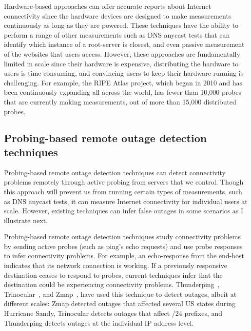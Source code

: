 Hardware-based approaches can offer accurate reports about
Internet connectivity since the hardware devices are designed to make
measurements continuously as long as they are powered. These techniques have the
ability to perform a range of other measurements such as DNS anycast
tests that can identify which instance of a root-server is closest,
and even passive measurement of the websites that users
access. However, these approaches are fundamentally limited in scale
since their hardware is expensive, distributing the hardware to users
is time consuming, and convincing users to keep their hardware running
is challenging. For example, the RIPE Atlas project, which began in
2010 and has been continuously expanding all across the world, has fewer than 10,000 probes that are currently making measurements, out
of more than 15,000 distributed probes.
 
\subsection{Probing-based remote outage detection techniques}


Probing-based remote outage detection techniques can detect
connectivity problems remotely through active probing from servers
that we control. Though this approach will prevent us from running
certain types of measurements, such as DNS anycast tests, it can measure
Internet connectivity for individual users at scale. However,
existing techniques can infer false outages in some scenarios as I
illustrate next.

Probing-based remote outage detection techniques study connectivity problems by
sending active probes (such as ping's echo requests) and use probe
responses to infer connectivity problems. For example, an
echo-response from the end-host indicates that its network connection
is working. If a previously responsive destination ceases to respond
to probes, current techniques infer that the destination could be
experiencing connectivity problems. Thunderping~\cite{pingin},
Trinocular~\cite{trinocular}, and Zmap~\cite{durumeric2013zmap}, have
used this technique to detect outages, albeit at different scales:
Zmap detected outages that affected several US states during Hurricane
Sandy, Trinocular detects outages that affect /24 prefixes, and
Thunderping detects outages at the individual IP address level.


